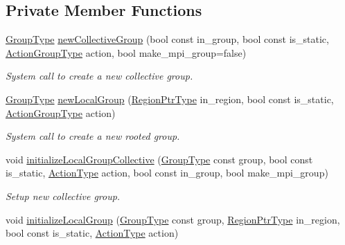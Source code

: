 \subsection*{Private Member Functions}
\begin{DoxyCompactItemize}
\item 
\hyperlink{namespacevt_a27b5e4411c9b6140c49100e050e2f743}{Group\+Type} \hyperlink{structvt_1_1group_1_1_group_manager_aeea7806669858363e19dfd221fee9cf5}{new\+Collective\+Group} (bool const in\+\_\+group, bool const is\+\_\+static, \hyperlink{structvt_1_1group_1_1_group_manager_ae871c5871ad62b530220009c1ee4d4b9}{Action\+Group\+Type} action, bool make\+\_\+mpi\+\_\+group=false)
\begin{DoxyCompactList}\small\item\em System call to create a new collective group. \end{DoxyCompactList}\item 
\hyperlink{namespacevt_a27b5e4411c9b6140c49100e050e2f743}{Group\+Type} \hyperlink{structvt_1_1group_1_1_group_manager_ad33dede56e2d4b79f447d851e1f3f154}{new\+Local\+Group} (\hyperlink{structvt_1_1group_1_1_group_manager_a9192e585fc2f99bfd5a6ff65fc21c40b}{Region\+Ptr\+Type} in\+\_\+region, bool const is\+\_\+static, \hyperlink{structvt_1_1group_1_1_group_manager_ae871c5871ad62b530220009c1ee4d4b9}{Action\+Group\+Type} action)
\begin{DoxyCompactList}\small\item\em System call to create a new rooted group. \end{DoxyCompactList}\item 
void \hyperlink{structvt_1_1group_1_1_group_manager_a1893365a719927e3f2d11b65f6bb806d}{initialize\+Local\+Group\+Collective} (\hyperlink{namespacevt_a27b5e4411c9b6140c49100e050e2f743}{Group\+Type} const group, bool const is\+\_\+static, \hyperlink{namespacevt_ae0a5a7b18cc99d7b732cb4d44f46b0f3}{Action\+Type} action, bool const in\+\_\+group, bool make\+\_\+mpi\+\_\+group)
\begin{DoxyCompactList}\small\item\em Setup new collective group. \end{DoxyCompactList}\item 
void \hyperlink{structvt_1_1group_1_1_group_manager_ac9f99d33480a89a5863e59d0470faea2}{initialize\+Local\+Group} (\hyperlink{namespacevt_a27b5e4411c9b6140c49100e050e2f743}{Group\+Type} const group, \hyperlink{structvt_1_1group_1_1_group_manager_a9192e585fc2f99bfd5a6ff65fc21c40b}{Region\+Ptr\+Type} in\+\_\+region, bool const is\+\_\+static, \hyperlink{namespacevt_ae0a5a7b18cc99d7b732cb4d44f46b0f3}{Action\+Type} action)

\end{DoxyCompactItemize}
